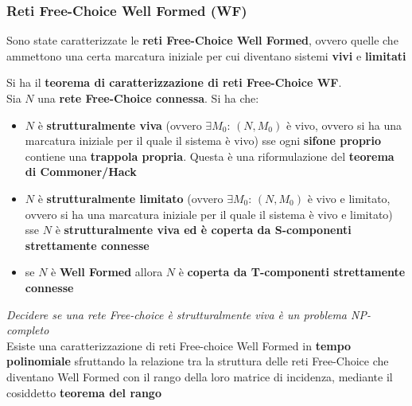 \documentclass[a4paper,12pt, oneside]{book}
\begin{document}
\subsubsection{Reti Free-Choice Well Formed (WF)}
Sono state caratterizzate le \textbf{reti Free-Choice Well Formed}, ovvero
quelle che ammettono una certa marcatura iniziale per cui diventano sistemi
\textbf{vivi} e \textbf{limitati}
\begin{teorema}
  Si ha il \textbf{teorema di caratterizzazione di reti Free-Choice WF}.\\
  Sia $N$ una \textbf{rete Free-Choice connessa}. Si ha che:
  \begin{itemize}
    \item $N$ è \textbf{strutturalmente viva} (ovvero $\exists M_0:\,(N,M_0)$ è
    vivo, ovvero si ha una marcatura iniziale per il quale il sistema è vivo)
    sse ogni \textbf{sifone proprio} contiene una \textbf{trappola
      propria}. Questa è una riformulazione del \textbf{teorema di
      Commoner/Hack} 
    \item $N$ è \textbf{strutturalmente limitato} (ovvero $\exists
    M_0:\,(N,M_0)$ è vivo e limitato, ovvero si ha una marcatura iniziale per il
    quale il sistema è vivo e limitato) sse $N$ è \textbf{strutturalmente viva
      ed è coperta da S-componenti strettamente connesse}
    \item se $N$ è \textbf{Well Formed} allora $N$ è \textbf{coperta da
      T-componenti strettamente connesse} 
  \end{itemize}
  \textit{Decidere se una rete Free-choice è strutturalmente viva è un problema
    NP-completo}\\
  Esiste una caratterizzazione di reti Free-choice Well Formed in \textbf{tempo
    polinomiale} sfruttando la relazione tra la struttura delle reti Free-Choice
  che diventano Well Formed con il rango della loro matrice di incidenza,
  mediante il cosiddetto \textbf{teorema del rango}
\end{teorema}
\end{document}
